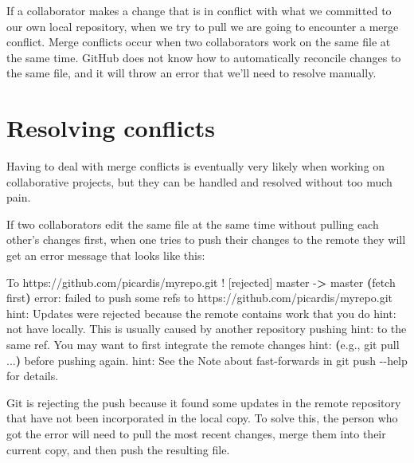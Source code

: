 \documentclass[
]{book}
\newenvironment{Shaded}{\begin{snugshade}}{\end{snugshade}}
\newcommand{\AttributeTok}[1]{\textcolor[rgb]{0.13,0.29,0.53}{#1}}
\newcommand{\ErrorTok}[1]{\textcolor[rgb]{0.64,0.00,0.00}{\textbf{#1}}}
\newcommand{\ExtensionTok}[1]{#1}
\newcommand{\KeywordTok}[1]{\textcolor[rgb]{0.13,0.29,0.53}{\textbf{#1}}}
\newcommand{\NormalTok}[1]{#1}
\newcommand{\OperatorTok}[1]{\textcolor[rgb]{0.81,0.36,0.00}{\textbf{#1}}}
\newcommand{\OtherTok}[1]{\textcolor[rgb]{0.56,0.35,0.01}{#1}}
\newcommand{\StringTok}[1]{\textcolor[rgb]{0.31,0.60,0.02}{#1}}
\begin{document}
If a collaborator makes a change that is in conflict with what we committed to our own local repository, when we try to pull we are going to encounter a merge conflict. Merge conflicts occur when two collaborators work on the same file at the same time. GitHub does not know how to automatically reconcile changes to the same file, and it will throw an error that we'll need to resolve manually.

\hypertarget{resolving-conflicts}{%
\section{Resolving conflicts}\label{resolving-conflicts}}

Having to deal with merge conflicts is eventually very likely when working on collaborative projects, but they can be handled and resolved without too much pain.

If two collaborators edit the same file at the same time without pulling each other's changes first, when one tries to push their changes to the remote they will get an error message that looks like this:

\begin{Shaded}
\begin{Highlighting}[]
\ExtensionTok{To}\NormalTok{ https://github.com/picardis/myrepo.git}
 \OtherTok{! }\ExtensionTok{[rejected]}\NormalTok{        master }\AttributeTok{{-}}\OperatorTok{\textgreater{}}\NormalTok{ master }\ErrorTok{(}\ExtensionTok{fetch}\NormalTok{ first}\KeywordTok{)}
\ExtensionTok{error:}\NormalTok{ failed to push some refs to }\StringTok{\textquotesingle{}https://github.com/picardis/myrepo.git\textquotesingle{}}
\ExtensionTok{hint:}\NormalTok{ Updates were rejected because the remote contains work that you do}
\ExtensionTok{hint:}\NormalTok{ not have locally. This is usually caused by another repository pushing}
\ExtensionTok{hint:}\NormalTok{ to the same ref. You may want to first integrate the remote changes}
\ExtensionTok{hint:} \ErrorTok{(}\ExtensionTok{e.g.,} \StringTok{\textquotesingle{}git pull ...\textquotesingle{}}\KeywordTok{)} \ExtensionTok{before}\NormalTok{ pushing again.}
\ExtensionTok{hint:}\NormalTok{ See the }\StringTok{\textquotesingle{}Note about fast{-}forwards\textquotesingle{}}\NormalTok{ in }\StringTok{\textquotesingle{}git push {-}{-}help\textquotesingle{}}\NormalTok{ for details.}
\end{Highlighting}
\end{Shaded}

Git is rejecting the push because it found some updates in the remote repository that have not been incorporated in the local copy. To solve this, the person who got the error will need to pull the most recent changes, merge them into their current copy, and then push the resulting file.
\end{document}
